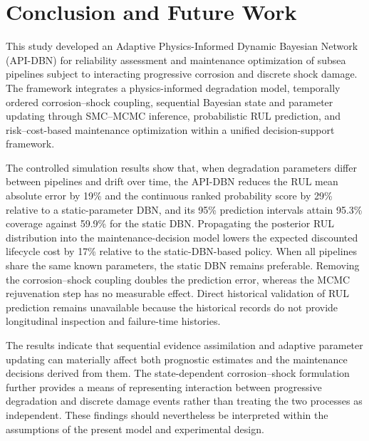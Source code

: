\documentclass[journal]{IEEEtran}
\begin{document}

\section{Conclusion and Future Work}
\label{sec:conclusion}

This study developed an Adaptive Physics-Informed Dynamic Bayesian
Network (API-DBN) for reliability assessment and maintenance
optimization of subsea pipelines subject to interacting progressive
corrosion and discrete shock damage. The framework integrates a
physics-informed degradation model, temporally ordered
corrosion--shock coupling, sequential Bayesian state and parameter
updating through SMC--MCMC inference, probabilistic RUL prediction,
and risk--cost-based maintenance optimization within a unified
decision-support framework.

The controlled simulation results show that, when degradation
parameters differ between pipelines and drift over time, the API-DBN
reduces the RUL mean absolute error by 19\% and the continuous ranked
probability score by 29\% relative to a static-parameter DBN, and its
95\% prediction intervals attain 95.3\% coverage against 59.9\% for the
static DBN. Propagating the posterior RUL distribution into the
maintenance-decision model lowers the expected discounted lifecycle cost
by 17\% relative to the static-DBN-based policy. When all pipelines
share the same known parameters, the static DBN remains preferable.
Removing the corrosion--shock coupling doubles the prediction error,
whereas the MCMC rejuvenation step has no measurable effect. Direct
historical validation of RUL prediction remains unavailable because the
historical records do not provide longitudinal inspection and
failure-time histories.

The results indicate that sequential evidence assimilation and
adaptive parameter updating can materially affect both prognostic
estimates and the maintenance decisions derived from them. The
state-dependent corrosion--shock formulation further provides a means
of representing interaction between progressive degradation and
discrete damage events rather than treating the two processes as
independent. These findings should nevertheless be interpreted within
the assumptions of the present model and experimental design.
\end{document}

